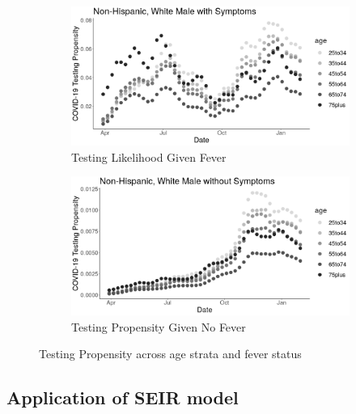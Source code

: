 \documentclass[11pt]{amsart}
\numberwithin{equation}{section}
\theoremstyle{plain}
\begin{document}
\begin{figure}[!th]
\centering
\begin{subfigure}{.5\textwidth}
 \centering
 \includegraphics[width=.9\linewidth]{../figs/tvprop_alt_fig1_mainpaper.png}
 \caption{Testing Likelihood Given Fever}
 \label{fig:testinglik1_mainpaper}
\end{subfigure}%
\begin{subfigure}{.5\textwidth}
 \centering
\includegraphics[width=.9\linewidth]{../figs/tvprop_alt_fig2_mainpaper.png}
 \caption{Testing Propensity Given No Fever}
 \label{fig:testinglik2_mainpaper}
\end{subfigure}
\caption{Testing Propensity across age strata and fever status}
\label{fig:testinglik_mainpaper}
\end{figure}


\subsection{Application of SEIR model}
\label{section:modelbased}
\end{document}
